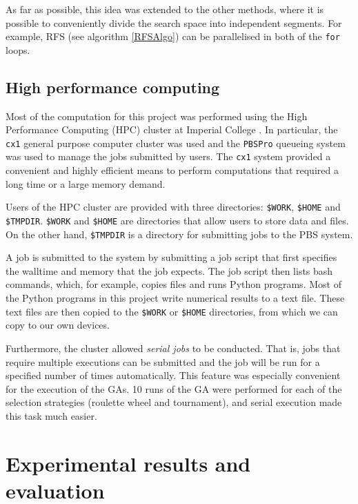 \documentclass[12pt, twoside, a4paper]{report}
\begin{document}
As far as possible, this idea was extended to the other methods, where it is possible to conveniently divide the search space into independent segments. For example, RFS (see algorithm \ref{RFSAlgo}) can be parallelised in both of the \texttt{for} loops.

\section{High performance computing} \label{hpc}

Most of the computation for this project was performed using the High Performance Computing (HPC) cluster at Imperial College \cite{RefWorks:218}. In particular, the \texttt{cx1} general purpose computer cluster was used and the \texttt{PBSPro} queueing system was used to manage the jobs submitted by users. The \texttt{cx1} system provided a convenient and highly efficient means to perform computations that required a long time or a large memory demand.

Users of the HPC cluster are provided with three directories: \texttt{\$WORK}, \texttt{\$HOME} and \texttt{\$TMPDIR}. \texttt{\$WORK} and \texttt{\$HOME} are directories that allow users to store data and files. On the other hand, \texttt{\$TMPDIR} is a directory for submitting jobs to the PBS system.

A job is submitted to the system by submitting a job script that first specifies the walltime and memory that the job expects. The job script then lists bash commands, which, for example, copies files and runs Python programs. Most of the Python programs in this project write numerical results to a text file. These text files are then copied to the \texttt{\$WORK} or \texttt{\$HOME} directories, from which we can copy to our own devices.

Furthermore, the cluster allowed \textit{serial jobs} to be conducted. That is, jobs that require multiple executions can be submitted and the job will be run for a specified number of times automatically. This feature was especially convenient for the execution of the GAs. 10 runs of the GA were performed for each of the selection strategies (roulette wheel and tournament), and serial execution made this task much easier.


\chapter{Experimental results and evaluation}
\label{evaluation}
\end{document}
